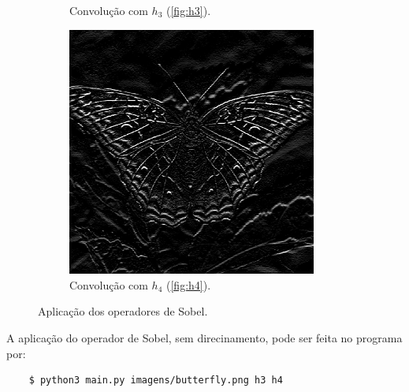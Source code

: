 \begin{figure}[H]
\begin{subfigure}{0.48\textwidth}
        \caption{Convolução com $h_3$ (\ref{fig:h3}).}
        \label{fig:sobel:x}
    \end{subfigure}%
    \begin{subfigure}{0.48\textwidth}
        \centering
        \includegraphics[width=0.9\textwidth]{resultados/butterfly_h4.png}
        \caption{Convolução com $h_4$ (\ref{fig:h4}).}
        \label{fig:sobel:y}
    \end{subfigure}

    \caption{Aplicação dos operadores de Sobel.}
    \label{fig:sobel}
\end{figure}

A aplicação do operador de Sobel, sem direcinamento, pode ser feita no programa por:

\begin{verbatim}
    $ python3 main.py imagens/butterfly.png h3 h4
\end{verbatim}
